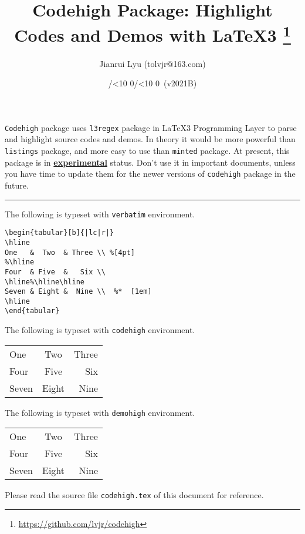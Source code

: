 \documentclass{article}
\newcommand*{\myversion}{2021B}
\newcommand*{\mydate}{\the\year/\mylpad\month/\mylpad\day\ (v\myversion)}
\newcommand*{\mylpad}[1]{\ifnum#1<10 0\the#1\else\the#1\fi}
\begin{document}
\title{\textsf{\color{green3}Codehigh Package: Highlight Codes and Demos with LaTeX3}%
       \footnote{\url{https://github.com/lvjr/codehigh}}}
\author{Jianrui Lyu (tolvjr@163.com)}
\date{\mydate}
\maketitle

\verb!Codehigh! package uses \verb!l3regex! package in \LaTeX3 Programming Layer
to parse and highlight source codes and demos.
In theory it would be more powerful than \verb!listings! package,
and more easy to use than \verb!minted! package.
At present, this package is in \underline{\color{red3}\textbf{experimental}} status.
Don’t use it in important documents, unless you have time
to update them for the newer versions of \verb!codehigh! package in the future.

\bigskip
\hrule
\bigskip

The following is typeset with \verb!verbatim! environment.

\begin{verbatim}
\begin{tabular}[b]{|lc|r|}
\hline
One   &  Two  & Three \\ %[4pt]
%\hline
Four  & Five  &   Six \\
\hline%\hline\hline
Seven & Eight &  Nine \\  %*  [1em]
\hline
\end{tabular}
\end{verbatim}

\medskip
The following is typeset with \verb!codehigh! environment.

\begin{codehigh}
\begin{tabular}[b]{|lc|r|}
\hline
One   &  Two  & Three \\ %
Four  & Five  &   Six \\
\hline%
Seven & Eight &  Nine \\  %
\hline
\end{tabular}
\end{codehigh}

\medskip
The following is typeset with \verb!demohigh! environment.

\begin{demohigh}
\begin{tabular}[b]{|lc|r|}
\hline
One   &  Two  & Three \\ %
Four  & Five  &   Six \\
\hline%
Seven & Eight &  Nine \\  %
\hline
\end{tabular}
\end{demohigh}

\medskip
Please read the source file \verb!codehigh.tex! of this document for reference.
\end{document}
